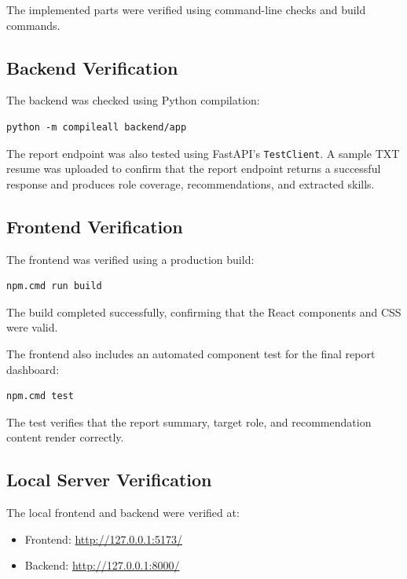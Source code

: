 \documentclass[12pt,a4paper]{article}
\begin{document}
The implemented parts were verified using command-line checks and build commands.

\subsection{Backend Verification}

The backend was checked using Python compilation:

\begin{lstlisting}
python -m compileall backend/app
\end{lstlisting}

The report endpoint was also tested using FastAPI's \texttt{TestClient}. A sample TXT resume was uploaded to confirm that the report endpoint returns a successful response and produces role coverage, recommendations, and extracted skills.

\subsection{Frontend Verification}

The frontend was verified using a production build:

\begin{lstlisting}
npm.cmd run build
\end{lstlisting}

The build completed successfully, confirming that the React components and CSS were valid.

The frontend also includes an automated component test for the final report dashboard:

\begin{lstlisting}
npm.cmd test
\end{lstlisting}

The test verifies that the report summary, target role, and recommendation content render correctly.

\subsection{Local Server Verification}

The local frontend and backend were verified at:

\begin{itemize}
    \item Frontend: \url{http://127.0.0.1:5173/}
    \item Backend: \url{http://127.0.0.1:8000/}
\end{itemize}
\end{document}
